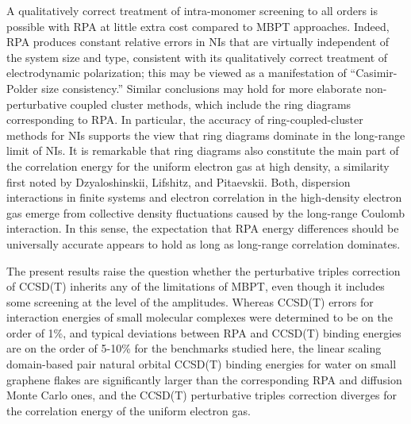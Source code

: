 \documentclass[journal=jctcce,manuscript=article]{achemso}
\begin{document}
A qualitatively correct treatment of intra-monomer
screening to all orders is possible with RPA at little extra cost
compared to MBPT approaches. Indeed, RPA produces
constant relative errors in NIs that are virtually independent of the system
size and type, consistent with its qualitatively correct treatment of
electrodynamic 
polarization; this may be viewed as a manifestation of ``Casimir-Polder
size consistency.''\cite{doi:10.1021/acs.jctc.7b00996}
Similar conclusions may hold for more elaborate 
non-perturbative coupled cluster methods, which include the ring
diagrams corresponding to RPA.\cite{doi:10.1063/1.3043729}
In particular, the accuracy of ring-coupled-cluster methods for
NIs\cite{doi:10.1063/1.3626551}
supports the view that ring diagrams dominate in the long-range limit
of NIs. It is remarkable that ring diagrams also constitute the main part
of the correlation energy for the uniform electron gas at high
density,\cite{PhysRev.106.364} 
a similarity first noted by Dzyaloshinskii, Lifshitz, and
Pitaevskii.\cite{Dzyaloshinskii1961165} Both, dispersion interactions in
finite systems and electron correlation in the high-density electron gas
emerge from collective density fluctuations\cite{PhysRev.82.625,PhysRev.85.338}
caused by the long-range Coulomb interaction. In this sense, the expectation
that RPA energy differences should be universally accurate\cite{PhysRevB.61.16430,PhysRevB.81.169902}
appears to hold as long as long-range correlation dominates. 

The present results raise the question whether the perturbative triples
correction of CCSD(T) inherits any of the limitations of MBPT, even though it
includes some screening at the level of the amplitudes. Whereas CCSD(T)
errors for interaction energies of small molecular complexes were determined
to be on the order of 1\%,\cite{doi:10.1021/ct400036b} and typical deviations
between RPA and CCSD(T) binding energies are on the order of 5-10\% for
the benchmarks studied here, the linear scaling domain-based pair natural
orbital CCSD(T) binding energies for water on small graphene flakes are
significantly larger than the corresponding RPA and diffusion Monte Carlo
ones,\cite{doi:10.1021/acs.jctc.9b00110} and the CCSD(T) perturbative triples
correction diverges for the correlation energy of the uniform electron
gas.\cite{PhysRevLett.110.226401}
\end{document}
